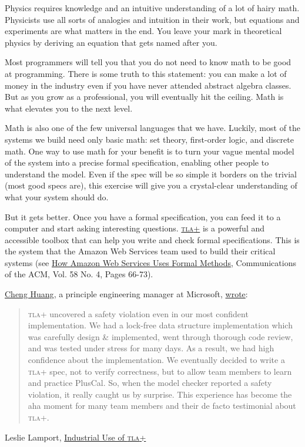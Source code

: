\documentclass{article}
\begin{document}
Physics requires knowledge and an intuitive understanding of a lot of hairy math.
Physicists use all sorts of analogies and intuition in their work, but equations and experiments are what matters in the end.
You leave your mark in theoretical physics by deriving an equation that gets named after you.

Most programmers will tell you that you do not need to know math to be good at programming.
There is some truth to this statement: you can make a lot of money in the industry even if you have never attended abstract algebra classes.
But as you grow as a professional, you will eventually hit the ceiling.
Math is what elevates you to the next level.

Math is also one of the few universal languages that we have.
Luckily, most of the systems we build need only basic math: set theory, first-order logic, and discrete math.
One way to use math for your benefit is to turn your vague mental model of the system into a precise formal specification, enabling other people to understand the model.
Even if the spec will be so simple it borders on the trivial (most good specs are), this exercise will give you a crystal-clear understanding of what your system should do.

But it gets better.
Once you have a formal specification, you can feed it to a computer and start asking interesting questions.
\href{https://lamport.azurewebsites.net/video/videos.html}{\textsc{tla}+} is a powerful and accessible toolbox that can help you write and check formal specifications.
This is the system that the Amazon Web Services team used to build their critical systems (see \href{https://lamport.azurewebsites.net/tla/formal-methods-amazon.pdf}{How Amazon Web Services Uses Formal Methods}, Communications of the ACM, Vol. 58 No. 4, Pages 66-73).

\href{https://www.linkedin.com/in/chenghuang/}{Cheng Huang}, a principle engineering manager at Microsoft, \href{https://lamport.azurewebsites.net/tla/industrial-use.html}{wrote}:
\blockquote{
  \textsc{tla}+ uncovered a safety violation even in our most confident implementation.
  We had a lock-free data structure implementation which was carefully design \& implemented, went through thorough code review, and was tested under stress for many days.
  As a result, we had high confidence about the implementation.
  We eventually decided to write a \textsc{tla}+ spec, not to verify correctness, but to allow team members to learn and practice PlusCal.
  So, when the model checker reported a safety violation, it really caught us by surprise.
  This experience has become the aha moment for many team members and their de facto testimonial about \textsc{tla}+.
}{Leslie Lamport, \href{https://lamport.azurewebsites.net/tla/industrial-use.html}{Industrial Use of \textsc{tla}+}}
\end{document}
